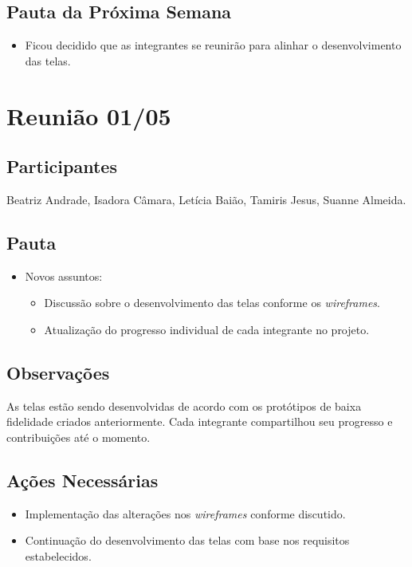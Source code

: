 \begin{apendicesenv}
\subsection*{Pauta da Próxima Semana}
\begin{itemize}
    \item Ficou decidido que as integrantes se reunirão para alinhar o desenvolvimento das telas.
\end{itemize}

\section*{Reunião 01/05}

\subsection*{Participantes}
Beatriz Andrade, Isadora Câmara, Letícia Baião, Tamiris Jesus, Suanne Almeida.

\subsection*{Pauta}
\begin{itemize}
    \item Novos assuntos:
    \begin{itemize}
        \item Discussão sobre o desenvolvimento das telas conforme os \textit{wireframes}.
        \item Atualização do progresso individual de cada integrante no projeto.
    \end{itemize}
\end{itemize}

\subsection*{Observações}
As telas estão sendo desenvolvidas de acordo com os protótipos de baixa fidelidade criados anteriormente.
Cada integrante compartilhou seu progresso e contribuições até o momento.

\subsection*{Ações Necessárias}
\begin{itemize}
    \item Implementação das alterações nos \textit{wireframes} conforme discutido.
    \item Continuação do desenvolvimento das telas com base nos requisitos estabelecidos.
\end{itemize}


\end{apendicesenv}
